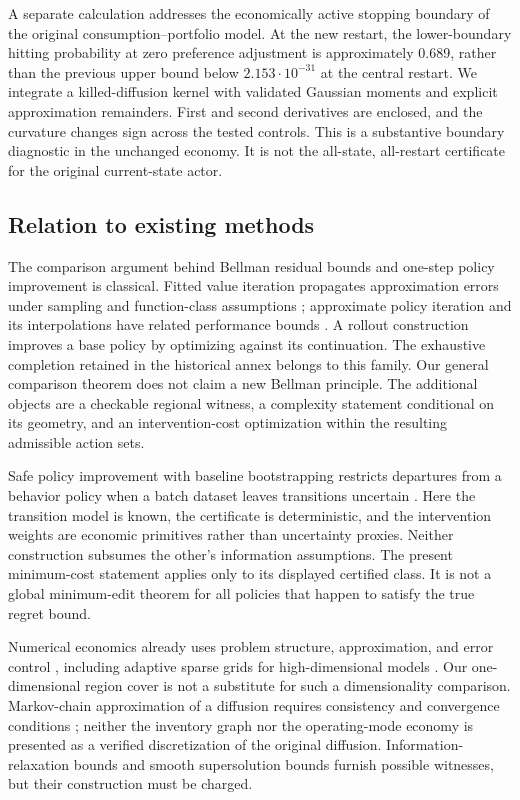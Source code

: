 A separate calculation addresses the economically active stopping boundary of the original consumption--portfolio model. At the new restart, the lower-boundary hitting probability at zero preference adjustment is approximately 0.689, rather than the previous upper bound below $2.153\cdot10^{-31}$ at the central restart. We integrate a killed-diffusion kernel with validated Gaussian moments and explicit approximation remainders. First and second derivatives are enclosed, and the curvature changes sign across the tested controls. This is a substantive boundary diagnostic in the unchanged economy. It is not the all-state, all-restart certificate for the original current-state actor.

\subsection{Relation to existing methods}
The comparison argument behind Bellman residual bounds and one-step policy improvement is classical. Fitted value iteration propagates approximation errors under sampling and function-class assumptions \citep{MunosSzepesvari2008}; approximate policy iteration and its interpolations have related performance bounds \citep{Scherrer2013}. A rollout construction improves a base policy by optimizing against its continuation. The exhaustive completion retained in the historical annex belongs to this family. Our general comparison theorem does not claim a new Bellman principle. The additional objects are a checkable regional witness, a complexity statement conditional on its geometry, and an intervention-cost optimization within the resulting admissible action sets.

Safe policy improvement with baseline bootstrapping restricts departures from a behavior policy when a batch dataset leaves transitions uncertain \citep{Laroche2019}. Here the transition model is known, the certificate is deterministic, and the intervention weights are economic primitives rather than uncertainty proxies. Neither construction subsumes the other's information assumptions. The present minimum-cost statement applies only to its displayed certified class. It is not a global minimum-edit theorem for all policies that happen to satisfy the true regret bound.

Numerical economics already uses problem structure, approximation, and error control \citep{Judd1998}, including adaptive sparse grids for high-dimensional models \citep{BrummScheidegger2017}. Our one-dimensional region cover is not a substitute for such a dimensionality comparison. Markov-chain approximation of a diffusion requires consistency and convergence conditions \citep{KushnerDupuis2001}; neither the inventory graph nor the operating-mode economy is presented as a verified discretization of the original diffusion. Information-relaxation bounds \citep{BrownSmithSun2010,BrownSmith2014} and smooth supersolution bounds furnish possible witnesses, but their construction must be charged.

